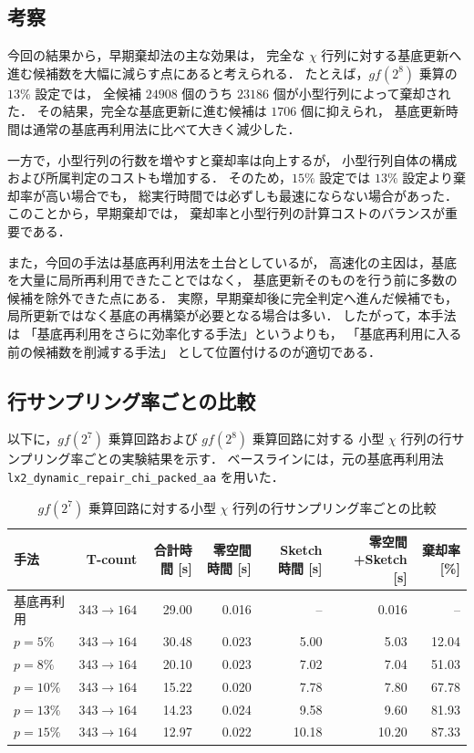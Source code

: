 \subsection{考察}

今回の結果から，早期棄却法の主な効果は，
完全な $\chi$ 行列に対する基底更新へ進む候補数を大幅に減らす点にあると考えられる．
たとえば，$gf(2^8)$ 乗算の $13\%$ 設定では，
全候補 $24908$ 個のうち $23186$ 個が小型行列によって棄却された．
その結果，完全な基底更新に進む候補は $1706$ 個に抑えられ，
基底更新時間は通常の基底再利用法に比べて大きく減少した．

一方で，小型行列の行数を増やすと棄却率は向上するが，
小型行列自体の構成および所属判定のコストも増加する．
そのため，$15\%$ 設定では $13\%$ 設定より棄却率が高い場合でも，
総実行時間では必ずしも最速にならない場合があった．
このことから，早期棄却では，
棄却率と小型行列の計算コストのバランスが重要である．

また，今回の手法は基底再利用法を土台としているが，
高速化の主因は，基底を大量に局所再利用できたことではなく，
基底更新そのものを行う前に多数の候補を除外できた点にある．
実際，早期棄却後に完全判定へ進んだ候補でも，
局所更新ではなく基底の再構築が必要となる場合は多い．
したがって，本手法は
「基底再利用をさらに効率化する手法」というよりも，
「基底再利用に入る前の候補数を削減する手法」
として位置付けるのが適切である．

\subsection{行サンプリング率ごとの比較}

以下に，$gf(2^7)$ 乗算回路および $gf(2^8)$ 乗算回路に対する
小型 $\chi$ 行列の行サンプリング率ごとの実験結果を示す．
ベースラインには，元の基底再利用法
\texttt{lx2\_dynamic\_repair\_chi\_packed\_aa} を用いた．

\begin{table}[H]
\centering
\caption{$gf(2^7)$ 乗算回路に対する小型 $\chi$ 行列の行サンプリング率ごとの比較}
\label{tab:gf27-sketch-rate}
\begin{tabular}{lrrrrrr}
\hline
手法 & T-count & 合計時間 [s] & 零空間時間 [s] & Sketch 時間 [s] & 零空間+Sketch [s] & 棄却率 [\%] \\
\hline
基底再利用 & $343 \to 164$ & 29.00 & 0.016 & --    & 0.016 & -- \\
$p=5\%$  & $343 \to 164$ & 30.48 & 0.023 & 5.00  & 5.03  & 12.04 \\
$p=8\%$  & $343 \to 164$ & 20.10 & 0.023 & 7.02  & 7.04  & 51.03 \\
$p=10\%$ & $343 \to 164$ & 15.22 & 0.020 & 7.78  & 7.80  & 67.78 \\
$p=13\%$ & $343 \to 164$ & 14.23 & 0.024 & 9.58  & 9.60  & 81.93 \\
$p=15\%$ & $343 \to 164$ & \cellcolor{green}12.97 & 0.022 & 10.18 & 10.20 & 87.33 \\
\hline
\end{tabular}
\end{table}

